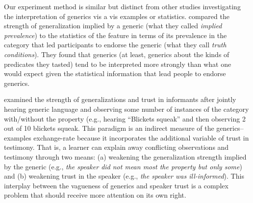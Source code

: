 \documentclass[10pt,letterpaper]{article}
\newcommand{\mht}[1]{\textcolor{Blue}{[mht: #1]}}
\begin{document}




Our experiment method is similar but distinct from other studies investigating the interpretation of generics vis a vis examples or statistics.
 compared the strength of generalization implied by a generic (what they called \emph{implied prevalence}) to the statistics of the feature in terms of its prevalence in the category that led participants to endorse the generic (what they call \emph{truth conditions}). They found that generics (at least, generics about the kinds of predicates they tasted) tend to be interpreted more strongly than what one would expect given the statistical information that lead people to endorse generics. 

 examined the strength of generalizations and trust in informants after jointly hearing generic language and observing some number of instances of the category with/without the property (e.g., hearing ``Blickets squeak'' and then observing 2 out of 10 blickets squeak.
This paradigm is an indirect measure of the generics--examples exchange-rate because it incorporates the additional variable of trust in testimony.
That is, a learner can explain away conflicting observations and testimony through two means: (a) weakening the generalization strength implied by the generic (e.g., \emph{the speaker did not mean most the property but only some}) and (b) weakening trust in the speaker (e.g., \emph{the speaker was ill-informed}). 
This interplay between the vagueness of generics and speaker trust is a complex problem that should receive more attention on its own right. 

\end{document}
